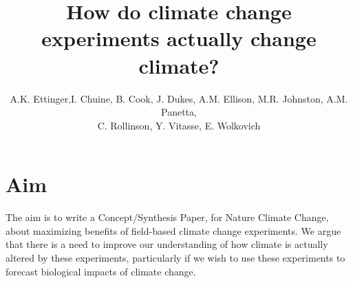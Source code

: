\documentclass{article}
\begin{document}
 
\title{How do climate change experiments actually change climate?} %

\author{A.K. Ettinger,I. Chuine, B. Cook, J. Dukes, A.M. Ellison, M.R. Johnston, A.M. Panetta,\\ C. Rollinson, Y. Vitasse, E. Wolkovich}
\maketitle  %

\section* {Aim}

The aim is to write a Concept/Synthesis Paper, for Nature Climate Change, about maximizing benefits of field-based climate change experiments. We argue that there is a need to improve our understanding of how climate is actually altered by these experiments, particularly if we wish to use these experiments to forecast biological impacts of climate change. %
\end{document}
